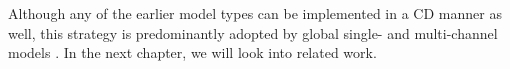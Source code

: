 \documentclass[a4paper,oneside,bibliography=totoc]{scrbook}
\begin{document}
Although any of the earlier model types can be implemented in a CD manner as well, this strategy is predominantly adopted by global single- and multi-channel models \cite{zhou_informer_2021, han_mcformer_2024, huang_hdmixer_2024}.
In the next chapter, we will look into related work. 
\end{document}
